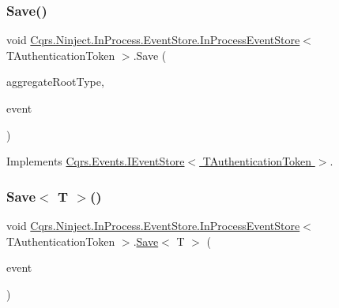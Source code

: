 \subsubsection{\texorpdfstring{Save()}{Save()}}
{\footnotesize\ttfamily void \hyperlink{classCqrs_1_1Ninject_1_1InProcess_1_1EventStore_1_1InProcessEventStore}{Cqrs.\+Ninject.\+In\+Process.\+Event\+Store.\+In\+Process\+Event\+Store}$<$ T\+Authentication\+Token $>$.Save (\begin{DoxyParamCaption}\item[{Type}]{aggregate\+Root\+Type,  }\item[{\hyperlink{interfaceCqrs_1_1Events_1_1IEvent}{I\+Event}$<$ T\+Authentication\+Token $>$ @}]{event }\end{DoxyParamCaption})}



Implements \hyperlink{interfaceCqrs_1_1Events_1_1IEventStore_a81fb586703e7c6dea6b23d9a95f3887a}{Cqrs.\+Events.\+I\+Event\+Store$<$ T\+Authentication\+Token $>$}.

\mbox{\label{classCqrs_1_1Ninject_1_1InProcess_1_1EventStore_1_1InProcessEventStore_a393924b175c56585bd4b5065d1b36f3e}} 
\subsubsection{\texorpdfstring{Save$<$ T $>$()}{Save< T >()}}
{\footnotesize\ttfamily void \hyperlink{classCqrs_1_1Ninject_1_1InProcess_1_1EventStore_1_1InProcessEventStore}{Cqrs.\+Ninject.\+In\+Process.\+Event\+Store.\+In\+Process\+Event\+Store}$<$ T\+Authentication\+Token $>$.\hyperlink{classCqrs_1_1Ninject_1_1InProcess_1_1EventStore_1_1InProcessEventStore_a21816423f7b71249f3dc7ce14952e1e5}{Save}$<$ T $>$ (\begin{DoxyParamCaption}\item[{\hyperlink{interfaceCqrs_1_1Events_1_1IEvent}{I\+Event}$<$ T\+Authentication\+Token $>$ @}]{event }\end{DoxyParamCaption})}




